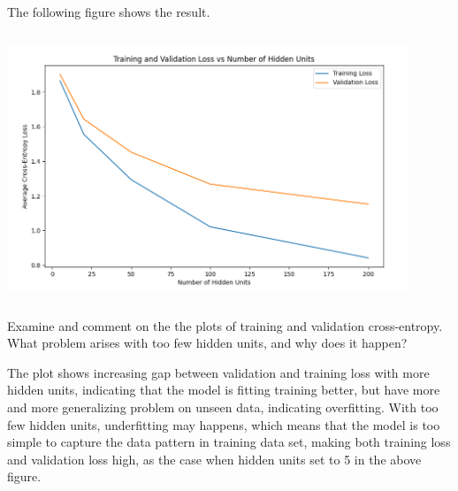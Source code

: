 \documentclass[11pt,addpoints,answers]{exam}
\begin{document}
\begin{questions}
\begin{parts}
\begin{subparts}
\begin{your_solution}[title=Avg. Train and Validation Cross-Entropy Loss,height=10cm,width=14.5cm]
The following figure shows the result.
\newline
\begin{minipage}{1\linewidth}
	\centering
	\includegraphics[width=12cm, height=8cm]{../Q3_1_res.png}
	\label{fig:Q3_1_res}         %
\end{minipage}
\newline

\end{your_solution}

\clearpage


\subpart[2] Examine and comment on the the plots of training and validation cross-entropy. What problem arises with too few hidden units, and why does it happen? 

\begin{your_solution}[title=Answer,height=4cm,width=14.5cm]

The plot shows increasing gap between validation and training loss with more hidden units, indicating that the model is fitting training better, but have  more and more generalizing problem on unseen data, indicating overfitting. \newline
With too few hidden units, underfitting may happens, which means that the model is too simple to capture the data pattern in training data set, making both training loss and validation loss high, as the case when hidden units set to 5 in the above figure.
\end{your_solution}
\end{subparts}


\end{parts}
\end{questions}
\end{document}
